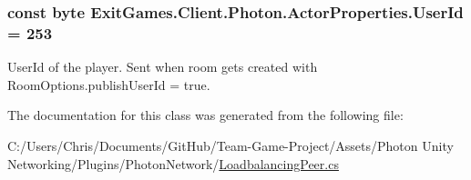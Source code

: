 \subsubsection[{\texorpdfstring{User\+Id}{UserId}}]{\setlength{\rightskip}{0pt plus 5cm}const byte Exit\+Games.\+Client.\+Photon.\+Actor\+Properties.\+User\+Id = 253}\hypertarget{class_exit_games_1_1_client_1_1_photon_1_1_actor_properties_adfc9d5eec7a43fee4bbf227d6bb0451f}{}\label{class_exit_games_1_1_client_1_1_photon_1_1_actor_properties_adfc9d5eec7a43fee4bbf227d6bb0451f}


User\+Id of the player. Sent when room gets created with Room\+Options.\+publish\+User\+Id = true.



The documentation for this class was generated from the following file\+:\begin{DoxyCompactItemize}
\item 
C\+:/\+Users/\+Chris/\+Documents/\+Git\+Hub/\+Team-\/\+Game-\/\+Project/\+Assets/\+Photon Unity Networking/\+Plugins/\+Photon\+Network/\hyperlink{_loadbalancing_peer_8cs}{Loadbalancing\+Peer.\+cs}\end{DoxyCompactItemize}
